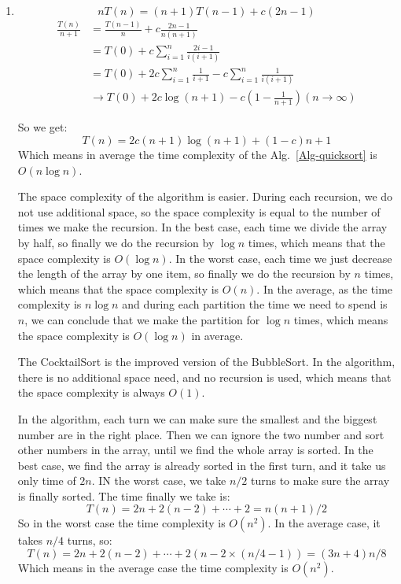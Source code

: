 \documentclass[12pt,a4paper]{article}
\makeatletter
\newtheorem*{solution}{Solution}
\theoremstyle{definition}
\renewenvironment{solution}[1][Solution] {\par\pushQED{\qed}\normalfont\topsep6\p@\@plus6\p@\relax\trivlist\item[\hskip\labelsep\bfseries#1\@addpunct{.}]\ignorespaces}{\popQED\endtrivlist\@endpefalse} \makeatother
\makeatother
\begin{document}
\begin{enumerate}
\begin{solution}
\begin{enumerate}
        $$nT(n) = (n+1)T(n-1) + c(2n-1)$$
        \begin{align*}
        \frac{T(n)}{n+1} &= \frac{T(n-1)}{n} + c\frac{2n-1}{n(n+1)} \\
        &= T(0) + c\sum^{n}_{i=1}\frac{2i-1}{i(i+1)}\\
        &= T(0) + 2c\sum^{n}_{i=1}\frac{1}{i+1} - c\sum^{n}_{i=1}\frac{1}{i(i+1)}\\
        &\rightarrow T(0)+2c\log(n+1) - c(1-\frac{1}{n+1}) (n \rightarrow \infty)       
        \end{align*}
        
        So we get: $$T(n) = 2c(n+1)\log(n+1) +(1-c)n+1$$
        Which means in average the time complexity of the Alg.~\ref{Alg-quicksort} is $O(n\log n)$.
        
        The space complexity of the algorithm is easier. During each recursion, we do not use additional space, so the space complexity is equal to the number of times we make the recursion. In the best case, each time we divide the array by half, so finally we do the recursion by $\log n$ times, which means that the space complexity is $O(\log n)$. In the worst case, each time we just decrease the length of the array by one item, so finally we do the recursion by $n$ times, which means that the space complexity is $O(n)$. In the average, as the time complexity is $n\log n$ and during each partition the time we need to spend is $n$, we can conclude that we make the partition for $\log n$ times, which means the space complexity is $O(\log n)$ in average.
        
        The CocktailSort is the improved version of the BubbleSort. In the algorithm, there is no additional space need, and no recursion is used, which means that the space complexity is always $O(1)$.
        
        In the algorithm, each turn we can make sure the smallest and the biggest number are in the right place. Then we can ignore the two number and sort other numbers in the array, until we find the whole array is sorted. In the best case, we find the array is already sorted in the first turn, and it take us only time of $2n$. IN the worst case, we take $n/2$ turns to make sure the array is finally sorted. The time finally we take is:
        $$T(n) = 2n + 2(n - 2) + \cdots + 2 = n(n+1)/2$$
        So in the worst case the time complexity is $O(n^2)$.
        In the average case, it takes $n/4$ turns, so:
        $$T(n) = 2n + 2(n-2) + \cdots + 2(n-2\times (n/4 -1)) = (3n+4)n/8 $$
        Which means in the average case the time complexity is $O(n^2)$.
        

\end{enumerate}
\end{solution}
\end{enumerate}
\end{document}
